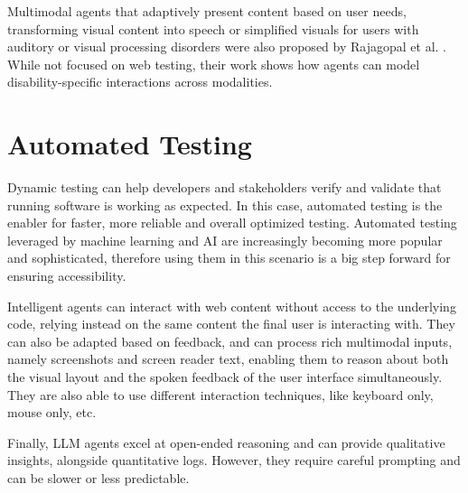 Multimodal agents that adaptively present content based on user needs, transforming visual content into speech or simplified visuals for users with auditory or visual processing disorders were also proposed by Rajagopal et al. \cite{rajagopal2023design}. While not focused on web testing, their work shows how agents can model disability-specific interactions across modalities.

\section{Automated Testing} %

Dynamic testing can help developers and stakeholders verify and validate that running software is working as expected\cite{vasquez2018continuous}. In this case, automated testing is the enabler for faster, more reliable and overall optimized testing. Automated testing leveraged by machine learning and \ac{AI} are increasingly becoming more popular and sophisticated, therefore using them in this scenario is a big step forward for ensuring accessibility.

Intelligent agents can interact with web content without access to the underlying code, relying instead on the same content the final user is interacting with\cite{lanham2025ai, wang2024survey, lu2025uxagent}. They can also be adapted based on feedback, and can process rich multimodal inputs, namely screenshots and screen reader text, enabling them to reason about both the visual layout and the spoken feedback of the user interface simultaneously. They are also able to use different interaction techniques, like keyboard only, mouse only, etc. 

Finally, LLM agents excel at open-ended reasoning and can provide qualitative insights, alongside quantitative logs. However, they require careful prompting and can be slower or less predictable.
\vspace{-8pt}